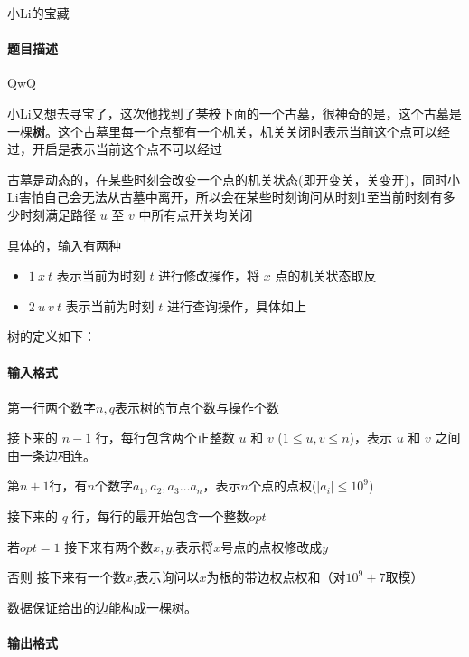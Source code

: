 \documentclass[UTF8]{ctexart}
\begin{document}
\begin{center}
    \large{小Li的宝藏}
\end{center}
\paragraph{题目描述} QwQ

小Li又想去寻宝了，这次他找到了\sout{某校}下面的一个古墓，很神奇的是，这个古墓是一棵\textbf{树}。这个古墓里每一个点都有一个机关，机关关闭时表示当前这个点可以经过，开启是表示当前这个点不可以经过

古墓是动态的，在某些时刻会改变一个点的机关状态(即开变关，关变开)，同时小Li害怕自己会无法从古墓中离开，所以会在某些时刻询问从时刻1至当前时刻有多少时刻满足路径 $u$ 至 $v$ 中所有点开关均关闭

具体的，输入有两种

\begin{itemize}

\item $1\ x\ t$ 表示当前为时刻 $t$ 进行修改操作，将 $x$ 点的机关状态取反
\item $2\ u\ v\ t$ 表示当前为时刻 $t$ 进行查询操作，具体如上

\end{itemize} 

树的定义如下：

\paragraph{输入格式}
\paragraph{}
第一行两个数字$n,q$表示树的节点个数与操作个数

接下来的 $n-1$ 行，每行包含两个正整数 $u$ 和 $v$ ($1\le u,v\le n$)，表示 $u$ 和 $v$ 之间由一条边相连。

第$n+1$行，有$n$个数字$a_1,a_2,a_3\ldots a_n$，表示$n$个点的点权($|a_i|\leq 10^9$)

接下来的 $q$ 行，每行的最开始包含一个整数$opt$

若$opt=1$ 接下来有两个数$x,y$,表示将$x$号点的点权修改成$y$

否则 接下来有一个数$x$,表示询问以$x$为根的带边权点权和（对$10^9+7$取模）

数据保证给出的边能构成一棵树。

\paragraph{输出格式}
\end{document}
